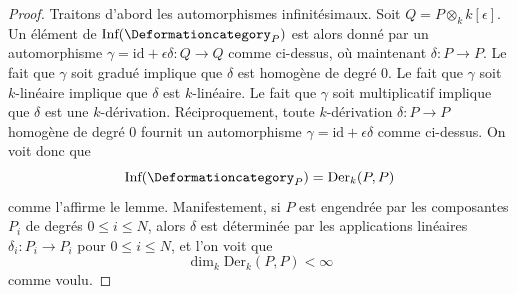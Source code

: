 \begin{proof}
Traitons d'abord les automorphismes infinitésimaux.
Soit $Q = P \otimes_k k[\epsilon]$.
Un élément de $\text{Inf}(\Deformationcategory_P)$
est alors donné par un automorphisme
$\gamma = \text{id} + \epsilon \delta : Q \to Q$
comme ci-dessus, où maintenant $\delta : P \to P$.
Le fait que $\gamma$ soit gradué implique que
$\delta$ est homogène de degré $0$.
Le fait que $\gamma$ soit $k$-linéaire implique que
$\delta$ est $k$-linéaire.
Le fait que $\gamma$ soit multiplicatif implique que
$\delta$ est une $k$-dérivation.
Réciproquement, toute $k$-dérivation $\delta : P \to P$
homogène de degré $0$ fournit un automorphisme
$\gamma = \text{id} + \epsilon \delta$ comme ci-dessus.
On voit donc que
$$
\text{Inf}(\Deformationcategory_P) = \text{Der}_k(P, P)
$$
comme l'affirme le lemme.
Manifestement, si $P$ est engendrée par les composantes $P_i$ de degrés
$0 \leq i \leq N$, alors $\delta$ est déterminée par
les applications linéaires $\delta_i : P_i \to P_i$ pour
$0 \leq i \leq N$, et l'on voit que
$$
\dim_k \text{Der}_k(P, P) < \infty
$$
comme voulu.


\end{proof}
